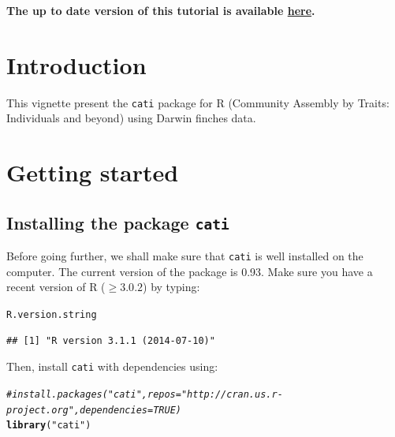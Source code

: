 \documentclass[12pt]{article}\usepackage[]{graphicx}\usepackage[]{color}
\makeatletter
\newcommand{\hlstr}[1]{\textcolor[rgb]{0.192,0.494,0.8}{#1}}%
\newcommand{\hlcom}[1]{\textcolor[rgb]{0.678,0.584,0.686}{\textit{#1}}}%
\newcommand{\hlstd}[1]{\textcolor[rgb]{0.345,0.345,0.345}{#1}}%
\newcommand{\hlkwd}[1]{\textcolor[rgb]{0.737,0.353,0.396}{\textbf{#1}}}%
\newenvironment{kframe}{%
 \def\at@end@of@kframe{}%
 \ifinner\ifhmode%
  \def\at@end@of@kframe{\end{minipage}}%
  \begin{minipage}{\columnwidth}%
 \fi\fi%
 \def\FrameCommand##1{\hskip\@totalleftmargin \hskip-\fboxsep
 \colorbox{shadecolor}{##1}\hskip-\fboxsep
     \hskip-\linewidth \hskip-\@totalleftmargin \hskip\columnwidth}%
 \MakeFramed {\advance\hsize-\width
   \@totalleftmargin\z@ \linewidth\hsize
   \@setminipage}}%
 {\par\unskip\endMakeFramed%
 \at@end@of@kframe}
\newenvironment{knitrout}{}{} %
\makeatother
\begin{document}
\vfill
\begin{center}
\textbf{The up to date version of this tutorial is available \href{http://sourceforge.net/p/cati-r/code/ci/master/tree/tutorial/vignettes/vignette.pdf}{here}.}
\end{center}

\newpage
\tableofcontents

\newpage


\section{Introduction}
This vignette present the \texttt{cati} package for R (Community Assembly by Traits: Individuals and beyond) using Darwin finches data.

\section{Getting started}
\subsection{Installing the package \texttt{cati}}

Before going further, we shall make sure that \texttt{cati} is well installed
on the computer.
The current version of the package is 0.93.
Make sure you have a recent version of R ($\geq 3.0.2$) by typing:

\begin{knitrout}
\color{fgcolor}\begin{kframe}
\begin{alltt}
\hlstd{R.version.string}
\end{alltt}
\begin{verbatim}
## [1] "R version 3.1.1 (2014-07-10)"
\end{verbatim}
\end{kframe}
\end{knitrout}

Then, install \texttt{cati} with dependencies using:
\begin{knitrout}
\color{fgcolor}\begin{kframe}
\begin{alltt}
\hlcom{#install.packages("cati", repos = "http://cran.us.r-project.org",                  dependencies = TRUE)}
\hlkwd{library}\hlstd{(}\hlstr{"cati"}\hlstd{)}
\end{alltt}


{\ttfamily\noindent\itshape\color{messagecolor}{\#\# Loading required package: nlme\\\#\# Loading required package: ade4\\\#\# Loading required package: ape}}\end{kframe}
\end{knitrout}
\end{document}
